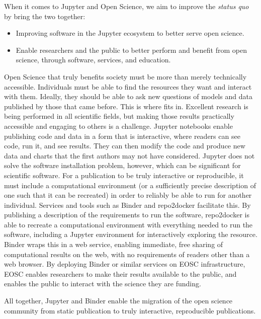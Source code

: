 When it comes to Jupyter and Open Science, we aim to improve the
\textit{status quo} by bring the two together:

\begin{itemize}
\item Improving software in the Jupyter ecosystem to better serve open
  science.
\item Enable researchers and the public to better perform and benefit
  from open science, through software, services, and education.
\end{itemize}

Open Science that truly benefits society must be more than merely
technically accessible.  Individuals must be able to find the
resources they want and interact with them.  Ideally, they should be
able to ask new questions of models and data published by those that
came before.  This is where \TheProject fits in.  Excellent research
is being performed in all scientific fields, but making those results
practically accessible and engaging to others is a challenge.
Jupyter notebooks enable publishing code and data in a form that is
interactive, where readers can see code, run it, and see results.
They can then modify the code and produce new data and charts that the
first authors may not have considered.  Jupyter does not solve the
software installation problem, however, which can be significant for
scientific software.  For a publication to be truly interactive or
reproducible, it must include a computational environment (or a
sufficiently precise description of one such that it can be recreated)
in order to reliably be able to run for another individual.  Services
and tools such as Binder and repo2docker facilitate this.  By
publishing a description of the requirements to run the software,
repo2docker is able to recreate a computational environment with
everything needed to run the software, including a Jupyter
environment for interactively exploring the resource.  Binder wraps
this in a web service, enabling immediate, free sharing of
computational results on the web, with no requirements of readers
other than a web browser.  By deploying Binder or similar services on
EOSC infrastructure, EOSC enables researchers to make their results
available to the public, and enables the public to interact with the
science they are funding.

All together, Jupyter and Binder enable the migration of the open
science community from static publication to truly interactive,
reproducible publications.


